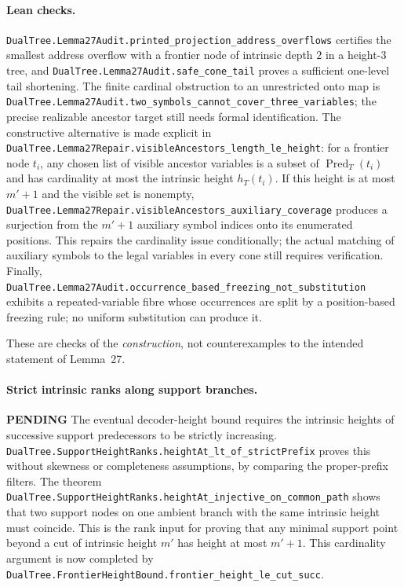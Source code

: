 \documentclass[11pt]{article}
\newcommand{\todo}{\textcolor{gray!70!black}{\textbf{PENDING}}}
\newcommand{\lean}[1]{\texttt{#1}}
\begin{document}
\paragraph{Lean checks.}
\lean{DualTree.Lemma27Audit.printed_projection_address_overflows}
certifies the smallest address overflow with a frontier node of intrinsic
depth $2$ in a height-$3$ tree, and
\lean{DualTree.Lemma27Audit.safe_cone_tail} proves a sufficient one-level
tail shortening. The finite cardinal obstruction to an unrestricted onto map
is \lean{DualTree.Lemma27Audit.two_symbols_cannot_cover_three_variables};
the precise realizable ancestor target still needs formal identification.
The constructive alternative is made explicit in
\lean{DualTree.Lemma27Repair.visibleAncestors_length_le_height}:
for a frontier node $t_i$, any chosen list of visible ancestor variables
is a subset of $\operatorname{Pred}_T(t_i)$ and has cardinality at most the
intrinsic height $h_T(t_i)$.  If this height is at most $m'+1$ and the
visible set is nonempty,
\lean{DualTree.Lemma27Repair.visibleAncestors_auxiliary_coverage}
produces a surjection from the $m'+1$ auxiliary symbol indices onto its
enumerated positions.  This repairs the cardinality issue conditionally;
the actual matching of auxiliary symbols to the legal variables in every
cone still requires verification.
Finally, \lean{DualTree.Lemma27Audit.occurrence_based_freezing_not_substitution}
exhibits a repeated-variable fibre whose occurrences are split by a
position-based freezing rule; no uniform substitution can produce it.

These are checks of the \emph{construction}, not counterexamples to the
intended statement of Lemma~27.

\paragraph{Strict intrinsic ranks along support branches.} \todo
The eventual decoder-height bound requires the intrinsic heights of
successive support predecessors to be strictly increasing.
\lean{DualTree.SupportHeightRanks.heightAt_lt_of_strictPrefix}
proves this without skewness or completeness assumptions, by
comparing the proper-prefix filters.  The theorem
\lean{DualTree.SupportHeightRanks.heightAt_injective_on_common_path}
shows that two support nodes on one ambient branch with the same
intrinsic height must coincide.  This is the rank input for proving
that any minimal support point beyond a cut of intrinsic height $m'$
has height at most $m'+1$.  This cardinality argument is now completed
by \lean{DualTree.FrontierHeightBound.frontier_height_le_cut_succ}.
\end{document}
